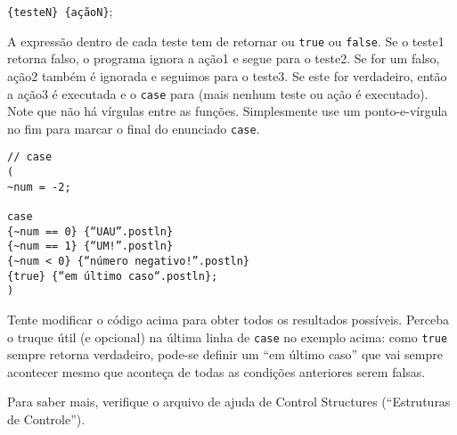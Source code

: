 \texttt{\{testeN\} \{açãoN\}};

A expressão dentro de cada teste tem de retornar ou \texttt{true} ou \texttt{false}. Se o teste1 retorna falso, o programa ignora a ação1 e segue para o teste2. Se for um falso, ação2 também é ignorada e seguimos para o teste3. Se este for verdadeiro, então a ação3 é executada e o \texttt{case} para (mais nenhum teste ou ação é executado). Note que não há vírgulas entre as funções. Simplesmente use um ponto-e-vírgula no fim para marcar o final do enunciado \texttt{case}.

 
\begin{lstlisting}[style=SuperCollider-IDE, basicstyle=\scttfamily\footnotesize]
// case
(
~num = -2;

case
{~num == 0} {“UAU”.postln}
{~num == 1} {“UM!”.postln}
{~num < 0} {“número negativo!”.postln}
{true} {“em último caso“.postln};
)
\end{lstlisting}
 
Tente modificar o código acima para obter todos os resultados possíveis. Perceba o truque útil (e opcional) na última linha de \texttt{case} no exemplo acima: como \texttt{true} sempre retorna verdadeiro, pode-se definir um “em último caso” que vai sempre acontecer mesmo que aconteça de todas as condições anteriores serem falsas.

Para saber mais, verifique o arquivo de ajuda de Control Structures (“Estruturas de Controle”).
